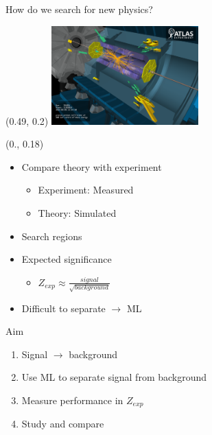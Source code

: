 \documentclass[UKenglish]{beamer}
\begin{document}
\begin{frame}{How do we search for new physics?}

    \begin{textblock}{1}(0.49, 0.2)
        \includegraphics[width = 0.425\textwidth]{figures/vp1_3dcocktail_run264034_evt11526514_2015-05-06T22-54-50_2}
    \end{textblock}
    \begin{textblock}{0.45}(0., 0.18)
        \begin{itemize}
            \item Compare theory with experiment 
            \begin{itemize}
                \item Experiment: Measured
                \item Theory: Simulated 
                \newline
            \end{itemize}
            \item Search regions
            \item Expected significance
            \begin{itemize}
                \item $Z_{exp}\approx \frac{signal}{\sqrt{background}}$
            \end{itemize}
            \item Difficult to separate $\rightarrow$ ML
        \end{itemize}
    \end{textblock}
\end{frame}
\begin{frame}
    \centering
    \begin{block}{Aim}
        \begin{enumerate}
            \item Signal $\rightarrow$ background
            \item Use ML to separate signal from background
            \item Measure performance in $Z_{exp}$
            \item Study and compare
        \end{enumerate}
    \end{block}
\end{frame}
\end{document}
